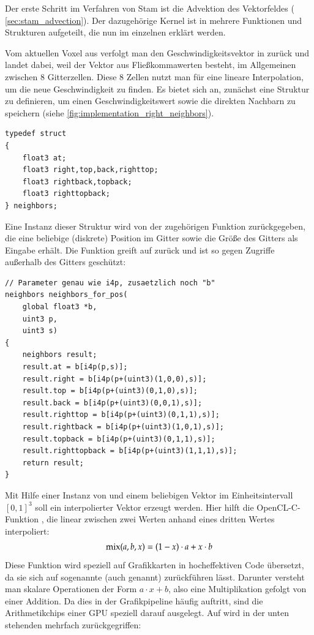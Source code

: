 Der erste Schritt im Verfahren von Stam ist die Advektion des
Vektorfeldes 
(\Pimiddyvgl{} \cref{sec:stam_advection}). Der dazugehörige Kernel ist in
mehrere Funktionen und Strukturen aufgeteilt, die nun im einzelnen
erklärt werden.

Vom aktuellen Voxel aus verfolgt man den Geschwindigkeitsvektor in
 zurück und landet dabei, weil der
Vektor aus Fließkommawerten besteht, im Allgemeinen zwischen 8
Gitterzellen. Diese 8 Zellen nutzt man für eine lineare Interpolation,
um die neue Geschwindigkeit zu finden. Es bietet sich an, zunächst
eine Struktur zu definieren, um einen Geschwindigkeitswert sowie die
direkten Nachbarn zu speichern (siehe
\cref{fig:implementation_right_neighbors}).

\begin{verbatim}
typedef struct
{
    float3 at;
    float3 right,top,back,righttop;
    float3 rightback,topback;
    float3 righttopback;
} neighbors;
\end{verbatim}

Eine Instanz dieser Struktur wird von der zugehörigen Funktion
 zurückgegeben, die eine
beliebige (diskrete) Position im Gitter sowie die Größe des Gitters
als Eingabe erhält. Die Funktion greift auf 
zurück und ist so gegen Zugriffe außerhalb des Gitters geschützt:

\begin{verbatim}
// Parameter genau wie i4p, zusaetzlich noch "b"
neighbors neighbors_for_pos(
    global float3 *b,
    uint3 p,
    uint3 s)
{
    neighbors result;
    result.at = b[i4p(p,s)];
    result.right = b[i4p(p+(uint3)(1,0,0),s)];
    result.top = b[i4p(p+(uint3)(0,1,0),s)];
    result.back = b[i4p(p+(uint3)(0,0,1),s)];
    result.righttop = b[i4p(p+(uint3)(0,1,1),s)];
    result.rightback = b[i4p(p+(uint3)(1,0,1),s)];
    result.topback = b[i4p(p+(uint3)(0,1,1),s)];
    result.righttopback = b[i4p(p+(uint3)(1,1,1),s)];
    return result;
}
\end{verbatim}

Mit Hilfe einer Instanz von  und einem
beliebigen Vektor im Einheitsintervall ${[0,1]}^3$ soll ein
interpolierter Vektor erzeugt werden. Hier hilft die OpenCL-C-Funktion
, die linear zwischen zwei Werten anhand eines
dritten Wertes interpoliert:
\begin{align}
\textnormal{mix}(a,b,x) = (1-x)\cdot a + x \cdot b
\end{align}
Diese Funktion wird speziell auf Grafikkarten in hocheffektiven Code
übersetzt, da sie sich auf sogenannte
 (auch
 genannt) zurückführen lässt. Darunter versteht man
skalare Operationen der Form $a\cdot x + b$, also eine Multiplikation
gefolgt von einer Addition. Da dies in der Grafikpipeline häufig
auftritt, sind die Arithmetikchips einer GPU speziell darauf
ausgelegt. Auf  wird in der unten stehenden
 mehrfach zurückgegriffen:

